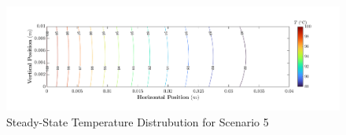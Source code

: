 \documentclass{article}
\begin{document}
\pagebreak

\begin{figure}[h]
    \centering
    \includegraphics[width=1\textwidth]{fig/contour5.png}
    \caption{Steady-State Temperature Distrubution for Scenario 5}
    \label{fig: Plot5}
\end{figure}
\end{document}
